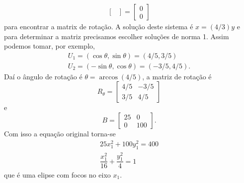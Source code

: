 \begin{exemplos}
\begin{enumerate}
\begin{solucao}
\begin{align*}
\begin{bmatrix}
        \end{bmatrix} = \begin{bmatrix}
          0 \\0
        \end{bmatrix}
      \end{align*}
      para encontrar a matrix de rotação. A solução deste sistema é $x = (4/3)y$ e para determinar a matriz precisamos escolher soluções de norma 1. Assim podemos tomar, por exemplo,
      \begin{align*}
        U_1 = (\cos\theta, \sin\theta) = (4/5, 3/5)\\
        U_2 = (-\sin\theta, \cos\theta) = (-3/5, 4/5).
      \end{align*}
      Daí o ângulo de rotação é $\theta = \arccos(4/5)$, a matriz de rotação é
      \[
        R_\theta = \begin{bmatrix}
          4/5 & -3/5\\
          3/5 & 4/5
        \end{bmatrix}
      \]
      e
      \[
        B = \begin{bmatrix}
          25 & 0\\
          0 & 100
        \end{bmatrix}.
      \]
      Com isso a equação original torna-se
      \begin{align*}
        25x_1^2 + 100y_1^2 = 400\\
        \dfrac{x_1^2}{16} + \dfrac{y_1^2}{4} = 1
      \end{align*}
      que é uma elipse com focos no eixo $x_1$.
    \end{solucao}


\end{enumerate}
\end{exemplos}

